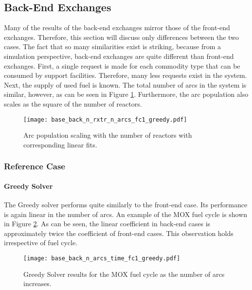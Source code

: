 \subsection{Back-End Exchanges}

Many of the results of the back-end exchanges mirror those of the front-end
exchanges. Therefore, this section will discuss only differences between the two
cases. The fact that so many similarities exist is striking, because from a
simulation perspective, back-end exchanges are quite different than front-end
exchanges. First, a single request is made for each commodity type that can be
consumed by support facilities. Therefore, many less requests exist in the
system. Next, the supply of used fuel is known. The total number of arcs in the
system is similar, however, as can be seen in Figure
\ref{fig:base_back_n_rxtr_n_arcs_fc1_greedy}. Furthermore, the arc
population also scales as the square of the number of reactors. 

\begin{figure}[h!]
  \begin{center}
    \texttt{[image: base\_back\_n\_rxtr\_n\_arcs\_fc1\_greedy.pdf]}
    \caption{
      \label{fig:base_back_n_rxtr_n_arcs_fc1_greedy}
      Arc population scaling with the number of reactors with corresponding linear fits.}
  \end{center}
\end{figure}

\subsubsection{Reference Case}

\paragraph{Greedy Solver}

The Greedy solver performs quite similarly to the front-end case. Its
performance is again linear in the number of arcs. An example of the MOX fuel
cycle is shown in Figure \ref{fig:base_back_n_arcs_time_fc1_greedy}. As can be seen,
the linear coefficient in back-end cases is approximately twice the coefficient
of front-end cases. This observation holds irrespective of fuel cycle.

\begin{figure}[h!]
  \begin{center}
    \texttt{[image: base\_back\_n\_arcs\_time\_fc1\_greedy.pdf]}
    \caption{
      \label{fig:base_back_n_arcs_time_fc1_greedy}
      Greedy Solver results for the MOX fuel cycle as the number of arcs
      increases.      
    }
  \end{center}
\end{figure}


